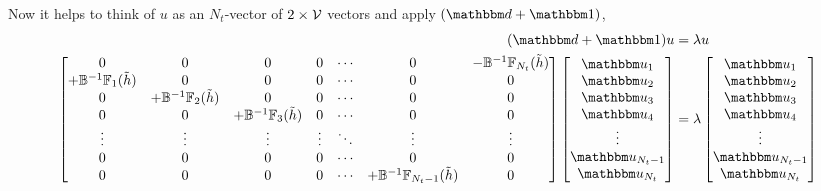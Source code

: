 Now it helps to think of $u$ as an $N_t$-vector of $2\times\mathcal{V}$ vectors and apply $(\dd+\one)$,
\begin{align}
    (\dd+\one) u &= \lambda u
    \nonumber\\
	\begin{bmatrix}
			0                               & 0                                 & 0                                 & 0         & \cdots & 0                                    & -\BB\inverse\FF_{N_t}(\tilde{h})
		\\	+\BB\inverse\FF_{1}(\tilde{h})  & 0                                 & 0                                 & 0         & \cdots & 0                                    & 0
		\\	0                               & +\BB\inverse\FF_{2}(\tilde{h})    & 0                                 & 0         & \cdots & 0                                    & 0
		\\	0                               & 0                                 & +\BB\inverse\FF_{3}(\tilde{h})    & 0         & \cdots & 0                                    & 0
		\\	\vdots                          & \vdots                            & \vdots                            & \vdots    & \ddots & \vdots                               & \vdots
		\\	0                               & 0                                 & 0                                 & 0         & \cdots & 0                                    & 0
		\\	0                               & 0                                 & 0                                 & 0         & \cdots & +\BB\inverse\FF_{N_t-1}(\tilde{h})   & 0
	\end{bmatrix}
    \begin{bmatrix}
            \uu_1
        \\  \uu_2
        \\  \uu_3
        \\  \uu_4
        \\  \vdots
        \\  \uu_{N_t-1}
        \\  \uu_{N_t}
    \end{bmatrix}
    &=
    \lambda
    \begin{bmatrix}
            \uu_1
        \\  \uu_2
        \\  \uu_3
        \\  \uu_4
        \\  \vdots
        \\  \uu_{N_t-1}
        \\  \uu_{N_t}
    \end{bmatrix}
\end{align}
